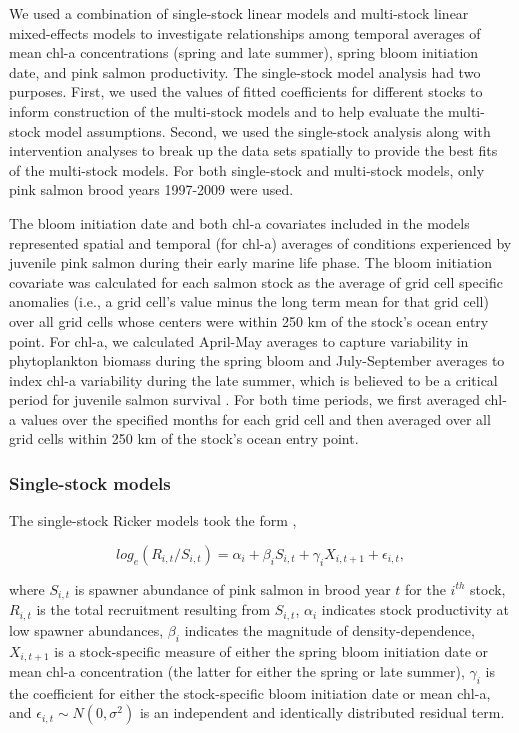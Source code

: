 We used a combination of single-stock linear models and multi-stock linear
mixed-effects models to investigate relationships among temporal averages of
mean chl-a concentrations (spring and late summer), spring bloom initiation
date, and pink salmon productivity. The single-stock model analysis had two
purposes. First, we used the values of fitted coefficients for different stocks
to inform construction of the multi-stock models and to help evaluate the
multi-stock model assumptions. Second, we used the single-stock analysis along
with intervention analyses to break up the data sets spatially to provide the
best fits of the multi-stock models. For both single-stock and multi-stock
models, only pink salmon brood years 1997-2009 were used.

The bloom initiation date and both chl-a covariates included in the models
represented spatial and temporal (for chl-a) averages of conditions experienced
by juvenile pink salmon during their early marine life phase. The bloom
initiation covariate was calculated for each salmon stock as the average of grid
cell specific anomalies (i.e., a grid cell's value minus the long term mean for
that grid cell) over all grid cells whose centers were within 250 km of the
stock's ocean entry point. For chl-a, we calculated April-May averages to
capture variability in phytoplankton biomass during the spring bloom and
July-September averages to index chl-a variability during the late summer, which
is believed to be a critical period for juvenile salmon survival
\citep{Beamish2001a, Moss2005a}. For both time periods, we first averaged chl-a
values over the specified months for each grid cell and then averaged over all
grid cells within 250 km of the stock's ocean entry point.

\subsubsection{Single-stock models}

The single-stock Ricker models took the form \citep{Adkison1996b},

\begin{equation}
log_e(R_{i,t} / S_{i,t}) = \alpha_i + \beta_i S_{i,t} + \gamma_i
X_{i,t+1} + \epsilon_{i,t}, \label{eq:bloom:2}
\end{equation}

\noindent
where \(S_{i,t}\) is spawner abundance of pink salmon in brood year \(t\) for
the \(i^{th}\) stock, \(R_{i,t}\) is the total recruitment resulting from
\(S_{i,t}\), \(\alpha_i\) indicates stock productivity at low spawner
abundances, \(\beta_i\) indicates the magnitude of density-dependence,
\(X_{i,t+1}\) is a stock-specific measure of either the spring bloom initiation
date or mean chl-a concentration (the latter for either the spring or late
summer), \(\gamma_i\) is the coefficient for either the stock-specific bloom
initiation date or mean chl-a, and \(\epsilon_{i,t} \sim N(0, \sigma^2)\) is an
independent and identically distributed residual term.

